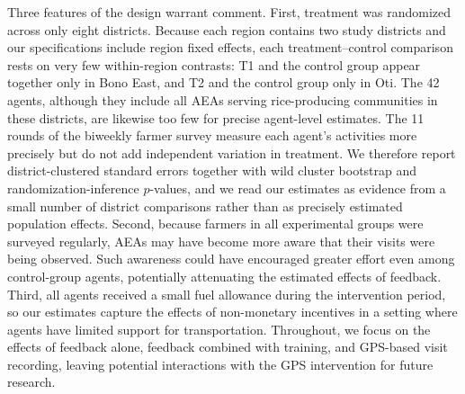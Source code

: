 \documentclass[11pt]{article}
\begin{document}
Three features of the design warrant comment. First, treatment was randomized across only eight districts. Because each region contains two study districts and our specifications include region fixed effects, each treatment--control comparison rests on very few within-region contrasts: T1 and the control group appear together only in Bono East, and T2 and the control group only in Oti. The 42 agents, although they include all AEAs serving rice-producing communities in these districts, are likewise too few for precise agent-level estimates. The 11 rounds of the biweekly farmer survey measure each agent's activities more precisely but do not add independent variation in treatment. We therefore report district-clustered standard errors together with wild cluster bootstrap and randomization-inference $p$-values, and we read our estimates as evidence from a small number of district comparisons rather than as precisely estimated population effects. Second, because farmers in all experimental groups were surveyed regularly, AEAs may have become more aware that their visits were being observed. Such awareness could have encouraged greater effort even among control-group agents, potentially attenuating the estimated effects of feedback. Third, all agents received a small fuel allowance during the intervention period, so our estimates capture the effects of non-monetary incentives in a setting where agents have limited support for transportation. Throughout, we focus on the effects of feedback alone, feedback combined with training, and GPS-based visit recording, leaving potential interactions with the GPS intervention for future research.
\end{document}
